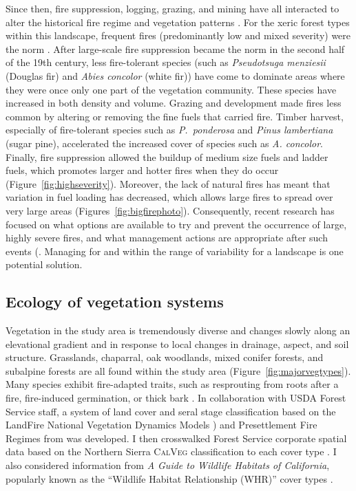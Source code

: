 Since then, fire suppression, logging, grazing, and mining have all interacted to alter the historical fire regime and vegetation patterns \citep{Stephens2015,Knapp2013}. For the xeric forest types within this landscape, frequent fires (predominantly low and mixed severity) were the norm \citep{Hessburg2005}. After large-scale fire suppression became the norm in the second half of the 19th century, less fire-tolerant species (such as \emph{Pseudotsuga menziesii} (Douglas fir) and \emph{Abies concolor} (white fir)) have come to dominate areas where they were once only one part of the vegetation community. These species have increased in both density and volume. Grazing and development made fires less common by altering or removing the fine fuels that carried fire. Timber harvest, especially of fire-tolerant species such as \emph{P.~ponderosa} and \emph{Pinus lambertiana} (sugar pine), accelerated the increased cover of species such as \emph{A. concolor}. Finally, fire suppression allowed the buildup of medium size fuels and ladder fuels, which promotes larger and hotter fires when they do occur (Figure~\ref{fig:highseverity}). Moreover, the lack of natural fires has meant that variation in fuel loading has decreased, which allows large fires to spread over very large areas \citep{Hessburg2005,Beaty2007,Meyer2008} (Figures~\ref{fig:bigfirephoto}). Consequently, recent research has focused on what options are available to try and prevent the occurrence of large, highly severe fires, and what management actions are appropriate after such events (\citep{Stephens2013,North2010}. Managing for and within the range of variability for a landscape is one potential solution.



\subsection{Ecology of vegetation systems}
Vegetation in the study area is tremendously diverse and changes slowly along an elevational gradient and in response to local changes in drainage, aspect, and soil structure. Grasslands, chaparral, oak woodlands, mixed conifer forests, and subalpine forests are all found within the study area (Figure~\ref{fig:majorvegtypes}). Many species exhibit fire-adapted traits, such as resprouting from roots after a fire, fire-induced germination, or thick bark \citep{VanWag2006}. In collaboration with USDA Forest Service staff, a system of land cover and seral stage classification based on the LandFire National Vegetation Dynamics Models \citeyearpar{Landfire2007}) and Presettlement Fire Regimes from \citet{VandeWater2011} was developed. I then crosswalked Forest Service corporate spatial data based on the Northern Sierra \textsc{CalVeg} classification to each cover type \cite{USDAForestService2008}. I also considered information from \emph{A Guide to Wildlife Habitats of California}, popularly known as the ``Wildlife Habitat Relationship (WHR)'' cover types \citep{WHR1988}. 

